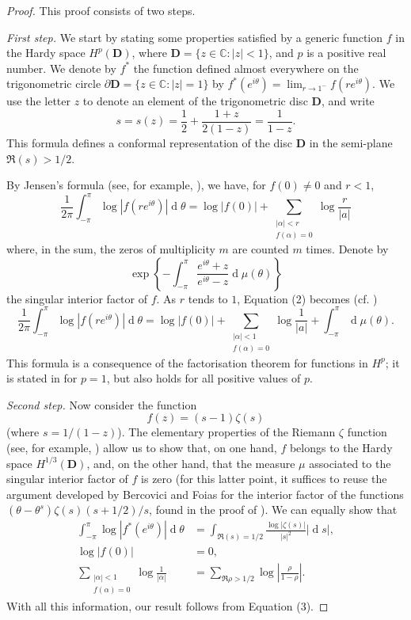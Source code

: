 \documentclass[
  letterpaper,
  DIV=11,
  numbers=noendperiod]{scrartcl}
\theoremstyle{remark}
\begin{document}
\begin{proof}
This proof consists of two steps.

\emph{First step.} We start by stating some properties satisfied by a
generic function \(f\) in the Hardy space \(H^p(\mathbf{D})\), where
\(\mathbf{D}=\{z\in\mathbb{C}:|z|<1\}\), and \(p\) is a positive real
number. We denote by \(f^*\) the function defined almost everywhere on
the trigonometric circle \(\partial\mathbf{D}=\{z\in\mathbb{C}:|z|=1\}\)
by \(f^*(e^{i\theta})=\lim_{r\to1^-}f(re^{i\theta})\). We use the letter
\(z\) to denote an element of the trigonometric disc \(\mathbf{D}\), and
write \[
  s = s(z) = \frac12+\frac{1+z}{2(1-z)} = \frac{1}{1-z}.
\] This formula defines a conformal representation of the disc
\(\mathbf{D}\) in the semi-plane \(\Re(s)>1/2\).


By Jensen's formula (see, for example, \autocite[Theorem 3.61]{4}), we
have, for \(f(0)\neq0\) and \(r<1\), \[
  \frac{1}{2\pi}\int_{-\pi}^\pi \log|f(re^{i\theta})|\operatorname{d}\!\theta
  = \log|f(0)| + \sum_{\substack{|\alpha|<r\\f(\alpha)=0}} \log\frac{r}{|a|}
\tag{2}
\] where, in the sum, the zeros of multiplicity \(m\) are counted \(m\)
times. Denote by \[
  \exp\left\{
    -\int_{-\pi}^\pi \frac{e^{i\theta}+z}{e^{i\theta}-z}\operatorname{d}\!\mu(\theta)
  \right\}
\] the singular interior factor of \(f\). As \(r\) tends to \(1\),
Equation (2) becomes (cf. \autocite[68]{2}) \[
  \frac{1}{2\pi}\int_{-\pi}^\pi \log|f(re^{i\theta})|\operatorname{d}\!\theta
  = \log|f(0)| + \sum_{\substack{|\alpha|<1\\f(\alpha)=0}} \log\frac{1}{|a|} + \int_{-\pi}^\pi\operatorname{d}\!\mu(\theta).
\tag{3}
\] This formula is a consequence of the factorisation theorem for
functions in \(H^p\); it is stated in \autocite{2} for \(p=1\), but also
holds for all positive values of \(p\).

\emph{Second step.} Now consider the function \[
  f(z) = (s-1)\zeta(s)
\] (where \(s=1/(1-z)\)). The elementary properties of the Riemann
\(\zeta\) function (see, for example, \autocite{5}) allow us to show
that, on one hand, \(f\) belongs to the Hardy space
\(H^{1/3}(\mathbf{D})\), and, on the other hand, that the measure
\(\mu\) associated to the singular interior factor of \(f\) is zero (for
this latter point, it suffices to reuse the argument developed by
Bercovici and Foias for the interior factor of the functions
\((\theta-\theta^s)\zeta(s)(s+1/2)/s\), found in the proof of
\autocite[Proposition 2.1]{1}). We can equally show that \[
  \begin{aligned}
    \int_{-\pi}^\pi \log|f^*(e^{i\theta})|\operatorname{d}\!\theta
    &= \int_{\Re(s)=1/2} \frac{\log|\zeta(s)|}{|s|^2}|\operatorname{d}\!s|,
  \\\log|f(0)|
    &= 0,
  \\\sum_{\substack{|\alpha|<1\\f(\alpha)=0}} \log\frac{1}{|\alpha|}
    &= \sum_{\Re\rho>1/2} \log\left|\frac{\rho}{1-\rho}\right|.
  \end{aligned}
\] With all this information, our result follows from Equation (3).
\end{proof}
\end{document}
